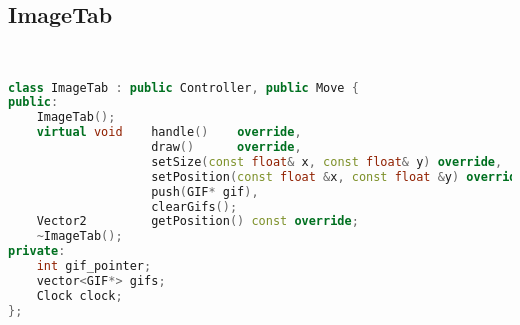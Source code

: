 \subsection{ImageTab}
\begin{lstlisting}[language=C++]


class ImageTab : public Controller, public Move {
public:
    ImageTab();
    virtual void    handle()    override,
                    draw()      override,
                    setSize(const float& x, const float& y) override,
                    setPosition(const float &x, const float &y) override,
                    push(GIF* gif),
                    clearGifs();
    Vector2         getPosition() const override;
    ~ImageTab();
private:
    int gif_pointer;
    vector<GIF*> gifs;
    Clock clock;
};






\end{lstlisting}
